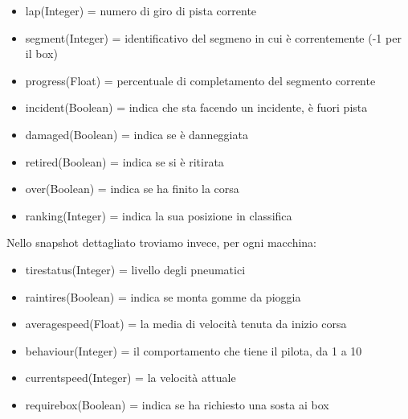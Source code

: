 \begin{itemize}
 \item lap(Integer) = numero di giro di pista corrente
 \item segment(Integer) = identificativo del segmeno in cui è correntemente (-1 per il box)
 \item progress(Float) = percentuale di completamento del segmento corrente
 \item incident(Boolean) = indica che sta facendo un incidente, è fuori pista
 \item damaged(Boolean) = indica se è danneggiata
 \item retired(Boolean) = indica se si è ritirata
 \item over(Boolean) = indica se ha finito la corsa
 \item ranking(Integer) = indica la sua posizione in classifica
\end{itemize}

Nello snapshot dettagliato troviamo invece, per ogni macchina:

\begin{itemize}
 \item tire\textunderscore status(Integer) = livello degli pneumatici
 \item rain\textunderscore tires(Boolean) = indica se monta gomme da pioggia
 \item average\textunderscore speed(Float) = la media di velocità tenuta da inizio corsa
 \item behaviour(Integer) = il comportamento che tiene il pilota, da 1 a 10
 \item current\textunderscore speed(Integer) = la velocità attuale
 \item require\textunderscore box(Boolean) = indica se ha richiesto una sosta ai box
\end{itemize}